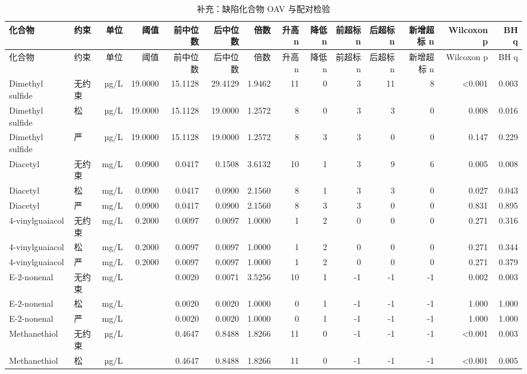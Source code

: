 {\scriptsize
\setlength{\tabcolsep}{3.5pt}
\begin{longtable}{llrrrrrrrrrrrr}
\caption{补充：缺陷化合物 OAV 与配对检验}
\label{tab:s11_q3_defect_chem}\\
\toprule
化合物 & 约束 & 单位 & 阈值 & 前中位数 & 后中位数 & 倍数 & 升高 n & 降低 n & 前超标 n & 后超标 n & 新增超标 n & Wilcoxon p & BH q \\
\midrule
\endfirsthead
\toprule
化合物 & 约束 & 单位 & 阈值 & 前中位数 & 后中位数 & 倍数 & 升高 n & 降低 n & 前超标 n & 后超标 n & 新增超标 n & Wilcoxon p & BH q \\
\midrule
\endhead
\bottomrule
\endlastfoot
Dimethyl sulfide & 无约束 & µg/L & 19.0000 & 15.1128 & 29.4129 & 1.9462 & 11 & 0 & 3 & 11 & 8 & <0.001 & 0.003 \\
Dimethyl sulfide & 松 & µg/L & 19.0000 & 15.1128 & 19.0000 & 1.2572 & 8 & 0 & 3 & 3 & 0 & 0.008 & 0.016 \\
Dimethyl sulfide & 严 & µg/L & 19.0000 & 15.1128 & 19.0000 & 1.2572 & 8 & 3 & 3 & 0 & 0 & 0.147 & 0.229 \\
Diacetyl & 无约束 & mg/L & 0.0900 & 0.0417 & 0.1508 & 3.6132 & 10 & 1 & 3 & 9 & 6 & 0.005 & 0.008 \\
Diacetyl & 松 & mg/L & 0.0900 & 0.0417 & 0.0900 & 2.1560 & 8 & 1 & 3 & 3 & 0 & 0.027 & 0.043 \\
Diacetyl & 严 & mg/L & 0.0900 & 0.0417 & 0.0900 & 2.1560 & 8 & 3 & 3 & 0 & 0 & 0.831 & 0.895 \\
4-vinylguaiacol & 无约束 & mg/L & 0.2000 & 0.0097 & 0.0097 & 1.0000 & 1 & 2 & 0 & 0 & 0 & 0.271 & 0.316 \\
4-vinylguaiacol & 松 & mg/L & 0.2000 & 0.0097 & 0.0097 & 1.0000 & 1 & 2 & 0 & 0 & 0 & 0.271 & 0.344 \\
4-vinylguaiacol & 严 & mg/L & 0.2000 & 0.0097 & 0.0097 & 1.0000 & 1 & 2 & 0 & 0 & 0 & 0.271 & 0.379 \\
E-2-nonenal & 无约束 & mg/L &  & 0.0020 & 0.0071 & 3.5256 & 10 & 1 & -1 & -1 & -1 & 0.002 & 0.003 \\
E-2-nonenal & 松 & mg/L &  & 0.0020 & 0.0020 & 1.0000 & 0 & 1 & -1 & -1 & -1 & 1.000 & 1.000 \\
E-2-nonenal & 严 & mg/L &  & 0.0020 & 0.0020 & 1.0000 & 0 & 1 & -1 & -1 & -1 & 1.000 & 1.000 \\
Methanethiol & 无约束 & µg/L &  & 0.4647 & 0.8488 & 1.8266 & 11 & 0 & -1 & -1 & -1 & <0.001 & 0.003 \\
Methanethiol & 松 & µg/L &  & 0.4647 & 0.8488 & 1.8266 & 11 & 0 & -1 & -1 & -1 & <0.001 & 0.005 \\

\end{longtable}}

